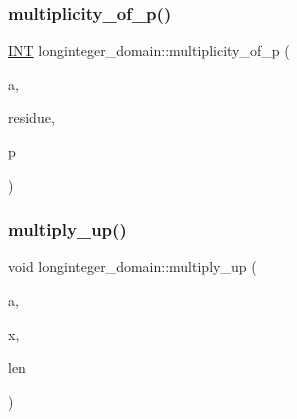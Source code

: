 \mbox{\label{classlonginteger__domain_a174b2ce4be57b455dee7c9562c56378b}} 
\subsubsection{\texorpdfstring{multiplicity\+\_\+of\+\_\+p()}{multiplicity\_of\_p()}}
{\footnotesize\ttfamily \mbox{\hyperlink{galois_8h_a09fddde158a3a20bd2dcadb609de11dc}{I\+NT}} longinteger\+\_\+domain\+::multiplicity\+\_\+of\+\_\+p (\begin{DoxyParamCaption}\item[{\mbox{\hyperlink{classlonginteger__object}{longinteger\+\_\+object}} \&}]{a,  }\item[{\mbox{\hyperlink{classlonginteger__object}{longinteger\+\_\+object}} \&}]{residue,  }\item[{\mbox{\hyperlink{galois_8h_a09fddde158a3a20bd2dcadb609de11dc}{I\+NT}}}]{p }\end{DoxyParamCaption})}

\mbox{\label{classlonginteger__domain_a65d533a72b585214a10374b4a18eb713}} 
\subsubsection{\texorpdfstring{multiply\+\_\+up()}{multiply\_up()}}
{\footnotesize\ttfamily void longinteger\+\_\+domain\+::multiply\+\_\+up (\begin{DoxyParamCaption}\item[{\mbox{\hyperlink{classlonginteger__object}{longinteger\+\_\+object}} \&}]{a,  }\item[{\mbox{\hyperlink{galois_8h_a09fddde158a3a20bd2dcadb609de11dc}{I\+NT}} $\ast$}]{x,  }\item[{\mbox{\hyperlink{galois_8h_a09fddde158a3a20bd2dcadb609de11dc}{I\+NT}}}]{len }\end{DoxyParamCaption})}

\mbox{\label{classlonginteger__domain_a74a0a83708b6508be09dda83f62c86a3}} 
